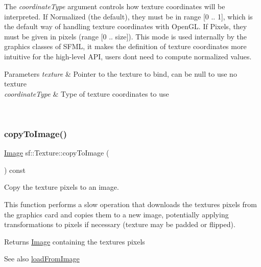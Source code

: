 The {\itshape coordinate\+Type} argument controls how texture coordinates will be interpreted. If Normalized (the default), they must be in range \mbox{[}0 .. 1\mbox{]}, which is the default way of handling texture coordinates with Open\+GL. If Pixels, they must be given in pixels (range \mbox{[}0 .. size\mbox{]}). This mode is used internally by the graphics classes of S\+F\+ML, it makes the definition of texture coordinates more intuitive for the high-\/level A\+PI, users don\textquotesingle{}t need to compute normalized values.


\begin{DoxyParams}{Parameters}
{\em texture} & Pointer to the texture to bind, can be null to use no texture \\
\hline
{\em coordinate\+Type} & Type of texture coordinates to use \begin{DoxyVerb}\end{DoxyVerb}
 \\
\hline
\end{DoxyParams}
\mbox{\label{classsf_1_1_texture_a77e18a70de2e525ac5e4a7cd95f614b9}} 
\subsubsection{\texorpdfstring{copyToImage()}{copyToImage()}}
{\footnotesize\ttfamily \mbox{\hyperlink{classsf_1_1_image}{Image}} sf\+::\+Texture\+::copy\+To\+Image (\begin{DoxyParamCaption}{ }\end{DoxyParamCaption}) const}



Copy the texture pixels to an image. 

This function performs a slow operation that downloads the texture\textquotesingle{}s pixels from the graphics card and copies them to a new image, potentially applying transformations to pixels if necessary (texture may be padded or flipped).

\begin{DoxyReturn}{Returns}
\mbox{\hyperlink{classsf_1_1_image}{Image}} containing the texture\textquotesingle{}s pixels
\end{DoxyReturn}
\begin{DoxySeeAlso}{See also}
\mbox{\hyperlink{classsf_1_1_texture_abec4567ad9856a3596dc74803f26fba2}{load\+From\+Image}} \begin{DoxyVerb}\end{DoxyVerb}
 
\end{DoxySeeAlso}
\mbox{\label{classsf_1_1_texture_a89b4c7d204acf1033c3a1b6e0a3ad0a3}} 
